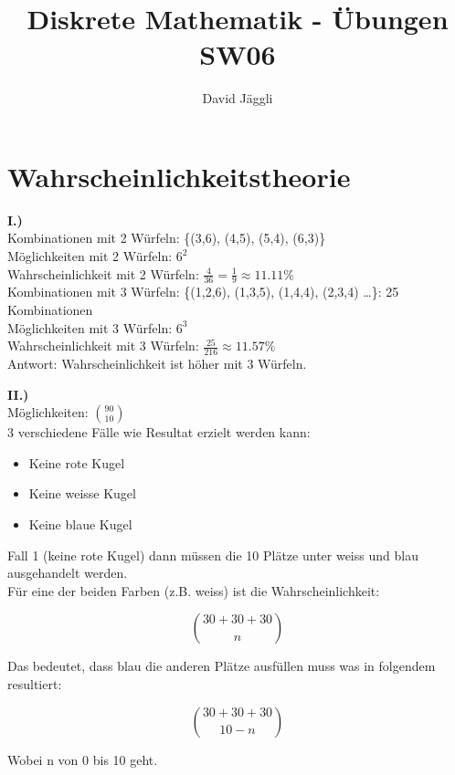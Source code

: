 \documentclass[12pt]{scrartcl}
\author{David Jäggli}
\title{Diskrete Mathematik - Übungen SW06}
\begin{document}
\maketitle

\tableofcontents

\newpage
\section{Wahrscheinlichkeitstheorie}
\textbf{I.)}\\
Kombinationen mit 2 Würfeln: \{(3,6), (4,5), (5,4), (6,3)\}\\
Möglichkeiten mit 2 Würfeln: $6^2$\\
Wahrscheinlichkeit mit 2 Würfeln: $\frac{4}{36} = \frac{1}{9} \approx 11.11\%$\\

Kombinationen mit 3 Würfeln: \{(1,2,6), (1,3,5), (1,4,4), (2,3,4) \dots\}: 25 Kombinationen\\
Möglichkeiten mit 3 Würfeln: $6^3$\\
Wahrscheinlichkeit mit 3 Würfeln: $\frac{25}{216} \approx 11.57\%$\\

Antwort: Wahrscheinlichkeit ist höher mit 3 Würfeln.\\
\vspace{25px}

\textbf{II.)}\\
Möglichkeiten: $\displaystyle{\binom{90}{10}}$\\

3 verschiedene Fälle wie Resultat erzielt werden kann: 
\begin{itemize}
    \item Keine rote Kugel
    \item Keine weisse Kugel
    \item Keine blaue Kugel
\end{itemize}

Fall 1 (keine rote Kugel) dann müssen die 10 Plätze unter weiss und blau ausgehandelt werden.\\
Für eine der beiden Farben (z.B. weiss) ist die Wahrscheinlichkeit:

\[\binom{30 + 30 + 30}{n}\]

Das bedeutet, dass blau die anderen Plätze ausfüllen muss was in folgendem resultiert:

\[\binom{30 + 30 +30}{10 - n}\]

Wobei n von 0 bis 10 geht.\\
\end{document}
